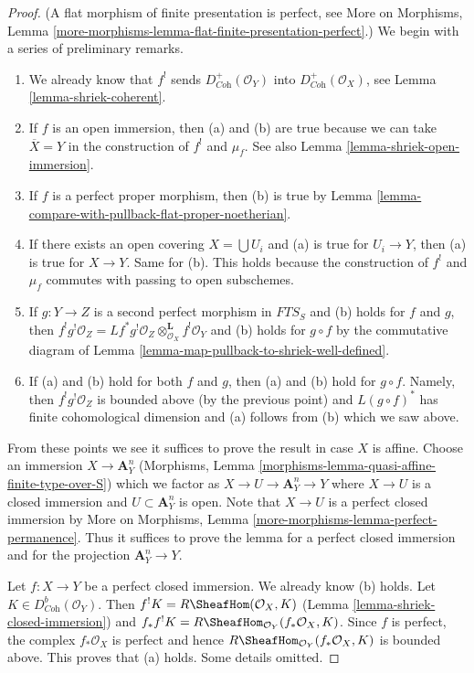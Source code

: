 \begin{proof}
(A flat morphism of finite presentation is perfect, see
More on Morphisms, Lemma
\ref{more-morphisms-lemma-flat-finite-presentation-perfect}.)
We begin with a series of preliminary remarks.
\begin{enumerate}
\item We already know that $f^!$ sends $D_{\textit{Coh}}^+(\mathcal{O}_Y)$
into $D_{\textit{Coh}}^+(\mathcal{O}_X)$, see
Lemma \ref{lemma-shriek-coherent}.
\item If $f$ is an open immersion, then (a) and (b) are true because
we can take $\overline{X} = Y$ in the construction of $f^!$ and $\mu_f$.
See also Lemma \ref{lemma-shriek-open-immersion}.
\item If $f$ is a perfect proper morphism, then (b) is true by
Lemma \ref{lemma-compare-with-pullback-flat-proper-noetherian}.
\item If there exists an open covering $X = \bigcup U_i$ and (a) is
true for $U_i \to Y$, then (a) is true for $X \to Y$. Same for (b).
This holds because the construction of $f^!$ and $\mu_f$ commutes
with passing to open subschemes.
\item If $g : Y \to Z$ is a second perfect morphism in $\textit{FTS}_S$
and (b) holds for $f$ and $g$, then
$f^!g^!\mathcal{O}_Z =
Lf^*g^!\mathcal{O}_Z \otimes_{\mathcal{O}_X}^\mathbf{L} f^!\mathcal{O}_Y$
and (b) holds for $g \circ f$ by the commutative diagram
of Lemma \ref{lemma-map-pullback-to-shriek-well-defined}.
\item If (a) and (b) hold for both $f$ and $g$, then
(a) and (b) hold for $g \circ f$. Namely, then $f^!g^!\mathcal{O}_Z$
is bounded above (by the previous point) and $L(g \circ f)^*$ has finite
cohomological dimension and (a) follows from (b) which we saw above.
\end{enumerate}
From these points we see it suffices to prove the result in case $X$ is affine.
Choose an immersion $X \to \mathbf{A}^n_Y$
(Morphisms, Lemma \ref{morphisms-lemma-quasi-affine-finite-type-over-S})
which we factor as $X \to U \to \mathbf{A}^n_Y \to Y$ where $X \to U$
is a closed immersion and $U \subset \mathbf{A}^n_Y$ is open.
Note that $X \to U$ is a perfect closed immersion by
More on Morphisms, Lemma \ref{more-morphisms-lemma-perfect-permanence}.
Thus it suffices to prove the lemma for a perfect closed immersion
and for the projection $\mathbf{A}^n_Y \to Y$.

\medskip\noindent
Let $f : X \to Y$ be a perfect closed immersion. We already know (b) holds.
Let $K \in D^b_{\textit{Coh}}(\mathcal{O}_Y)$.
Then $f^!K = R\SheafHom(\mathcal{O}_X, K)$
(Lemma \ref{lemma-shriek-closed-immersion})
and $f_*f^!K = R\SheafHom_{\mathcal{O}_Y}(f_*\mathcal{O}_X, K)$.
Since $f$ is perfect, the complex $f_*\mathcal{O}_X$ is perfect
and hence $R\SheafHom_{\mathcal{O}_Y}(f_*\mathcal{O}_X, K)$ is bounded above.
This proves that (a) holds. Some details omitted.


\end{proof}
